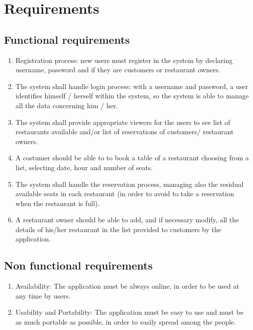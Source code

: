 \section{Requirements}
\subsection{Functional requirements}

\begin{enumerate}
\item Registration process: new users must register in the system by declaring username, password and if they are customers or restaurant owners.
\item The system shall handle login process: with a username and password, a user identifies himself / herself within the system, so the system is able to manage all the data concerning him / her.
\item The system shall provide appropriate viewers for the users to see list of restaurants available and/or list of reservations of customers/ restaurant owners.
\item A costumer should be able to to book a table of a restaurant choosing from a list, selecting date, hour and number of seats.
\item The system shall handle the reservation process, managing also the residual available seats in each restaurant (in order to avoid to take a reservation when the restaurant is full).
\item A restaurant owner should be able to add, and if necessary modify, all the details of his/her restaurant in the list provided to customers by the application.
\end{enumerate}

\subsection{Non functional requirements}
\begin{enumerate}
	\item Availability: The application must be always online, in order to be used at any time by users.
	\item Usability and Portability: The application must be easy to use and
		must be as much portable as possible, in order to easily spread among
		the people. 
\end{enumerate}
\newpage